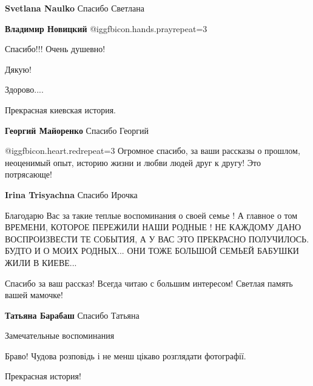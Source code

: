 \begin{itemize}
\begin{itemize} %
\textbf{Svetlana Naulko} Спасибо Светлана

\textbf{Владимир Новицкий}  @igg{fbicon.hands.pray}{repeat=3} 
\end{itemize} %

Спасибо!!!
Очень душевно!

Дякую!

Здорово....

Прекрасная киевская история.

\textbf{Георгий Майоренко} Спасибо Георгий

@igg{fbicon.heart.red}{repeat=3} Огромное спасибо, за ваши рассказы о прошлом, неоценимый опыт, историю жизни и любви людей друг к другу! Это потрясающе!

\textbf{Irina Trisyachna} Спасибо Ирочка


Благодарю Вас за такие теплые воспоминания о своей семье ! А главное о том
ВРЕМЕНИ, КОТОРОЕ ПЕРЕЖИЛИ НАШИ РОДНЫЕ ! НЕ КАЖДОМУ ДАНО ВОСПРОИЗВЕСТИ ТЕ
СОБЫТИЯ, А У ВАС ЭТО ПРЕКРАСНО ПОЛУЧИЛОСЬ. БУДТО И О МОИХ РОДНЫХ... ОНИ ТОЖЕ
БОЛЬШОЙ СЕМЬЕЙ БАБУШКИ ЖИЛИ В КИЕВЕ...

Спасибо за ваш рассказ! Всегда читаю с большим интересом! Светлая память вашей мамочке!

\textbf{Татьяна Барабаш} Спасибо Татьяна

Замечательные воспоминания

Браво!
Чудова розповідь і не менш цікаво розглядати фотографії.

Прекрасная история!

\end{itemize} %
